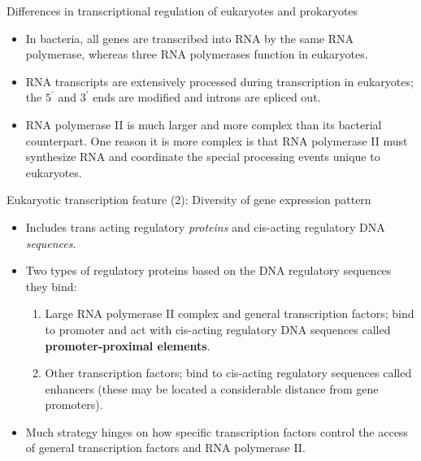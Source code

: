 \documentclass[11pt,dvipsnames,ignorenonframetext,aspectratio=169]{beamer}
\providecommand{\tightlist}{%
  \setlength{\itemsep}{0pt}\setlength{\parskip}{0pt}}
\begin{document}
\begin{frame}{Differences in transcriptional regulation of eukaryotes
and prokaryotes}
\protect\hypertarget{differences-in-transcriptional-regulation-of-eukaryotes-and-prokaryotes}{}

\begin{itemize}
\tightlist
\item
  In bacteria, all genes are transcribed into RNA by the same RNA
  polymerase, whereas three RNA polymerases function in eukaryotes.
\item
  RNA transcripts are extensively processed during transcription in
  eukaryotes; the \(5^\prime\) and \(3^\prime\) ends are modified and
  introns are spliced out.
\item
  RNA polymerase II is much larger and more complex than its bacterial
  counterpart. One reason it is more complex is that RNA polymerase II
  must synthesize RNA and coordinate the special processing events
  unique to eukaryotes.
\end{itemize}

\end{frame}

\begin{frame}{Eukaryotic transcription feature (2): Diversity of gene
expression pattern}
\protect\hypertarget{eukaryotic-transcription-feature-2-diversity-of-gene-expression-pattern}{}

\begin{itemize}
\tightlist
\item
  Includes trans acting regulatory \emph{proteins} and cis-acting
  regulatory DNA \emph{sequences}.
\item
  Two types of regulatory proteins based on the DNA regulatory sequences
  they bind:

  \begin{enumerate}
  \tightlist
  \item
    Large RNA polymerase II complex and general transcription factors;
    bind to promoter and act with cis-acting regulatory DNA sequences
    called \textbf{promoter-proximal elements}.
  \item
    Other transcription factors; bind to cis-acting regulatory sequences
    called enhancers (these may be located a considerable distance from
    gene promoters).
  \end{enumerate}
\item
  Much strategy hinges on how specific transcription factors control the
  access of general transcription factors and RNA polymerase II.
\end{itemize}

\end{frame}
\end{document}
